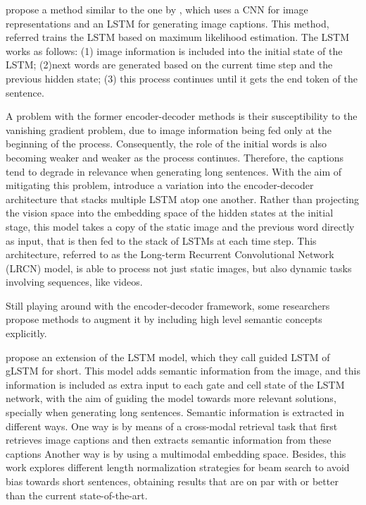 \citet{Vinyals2015} propose a method similar to the one by \citet{Kiros2014_VS}, which uses a CNN for image representations and an LSTM for generating image captions. This method, referred trains the LSTM based on maximum likelihood estimation. The LSTM works as follows: (1) image information is included into the initial state of the LSTM; (2)next words are generated based on the current time step and the previous hidden state; (3) this process continues until it gets the end token of the sentence. 

A problem with the former encoder-decoder methods is their susceptibility to the vanishing gradient problem, due to  image information being fed only at the beginning of the process. Consequently, the role of the initial words is also becoming weaker and weaker as the process continues. Therefore, the captions tend to degrade in relevance when generating long sentences. With the aim of mitigating this problem, \citet{Donahue2015} introduce a variation into the encoder-decoder architecture that stacks multiple LSTM atop one another. Rather than projecting the vision space into the embedding space of the hidden states at the initial stage, this model takes a copy of the static image and the previous word directly as input, that is then fed to the stack of LSTMs at each time step. This architecture, referred to as the Long-term Recurrent Convolutional Network (LRCN) model, is able to process not just static images, but also dynamic tasks involving sequences, like videos.

Still playing around with the encoder-decoder framework, some researchers propose methods to augment it by including high level semantic concepts explicitly. 

\citet{Jia2015} propose an extension of the LSTM model, which they call guided LSTM of gLSTM for short. This model adds semantic information from the image, and this information is included as extra input to each gate and cell state of the LSTM network, with the aim of guiding the model towards more relevant solutions, specially when generating long sentences. Semantic information is extracted in different ways. One way is by means of a cross-modal retrieval task that first retrieves image captions and then extracts semantic information from these captions Another way is by using a multimodal embedding space. Besides, this work explores different length normalization strategies for beam search to avoid bias towards short sentences, obtaining results that are on par with or better than the current state-of-the-art.

